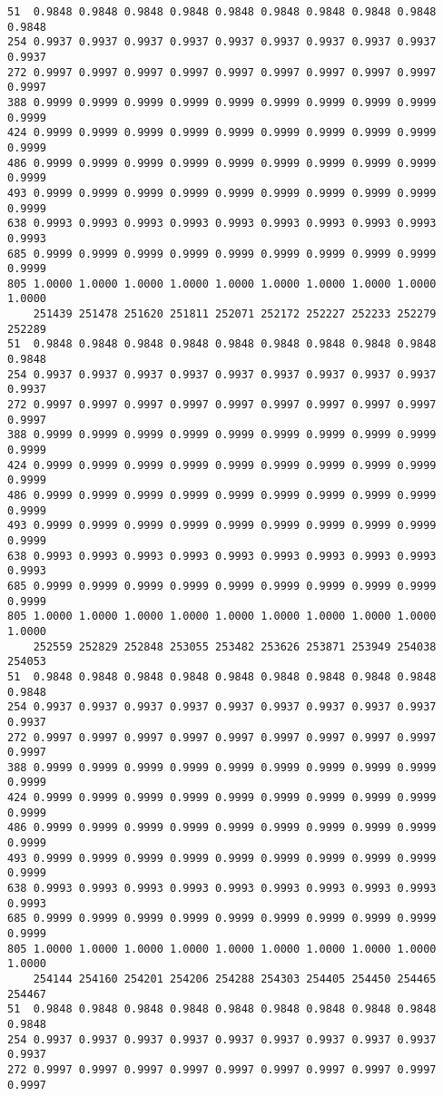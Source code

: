 \documentclass[
]{report}
\begin{document}
\begin{verbatim}
51  0.9848 0.9848 0.9848 0.9848 0.9848 0.9848 0.9848 0.9848 0.9848 0.9848
254 0.9937 0.9937 0.9937 0.9937 0.9937 0.9937 0.9937 0.9937 0.9937 0.9937
272 0.9997 0.9997 0.9997 0.9997 0.9997 0.9997 0.9997 0.9997 0.9997 0.9997
388 0.9999 0.9999 0.9999 0.9999 0.9999 0.9999 0.9999 0.9999 0.9999 0.9999
424 0.9999 0.9999 0.9999 0.9999 0.9999 0.9999 0.9999 0.9999 0.9999 0.9999
486 0.9999 0.9999 0.9999 0.9999 0.9999 0.9999 0.9999 0.9999 0.9999 0.9999
493 0.9999 0.9999 0.9999 0.9999 0.9999 0.9999 0.9999 0.9999 0.9999 0.9999
638 0.9993 0.9993 0.9993 0.9993 0.9993 0.9993 0.9993 0.9993 0.9993 0.9993
685 0.9999 0.9999 0.9999 0.9999 0.9999 0.9999 0.9999 0.9999 0.9999 0.9999
805 1.0000 1.0000 1.0000 1.0000 1.0000 1.0000 1.0000 1.0000 1.0000 1.0000
    251439 251478 251620 251811 252071 252172 252227 252233 252279 252289
51  0.9848 0.9848 0.9848 0.9848 0.9848 0.9848 0.9848 0.9848 0.9848 0.9848
254 0.9937 0.9937 0.9937 0.9937 0.9937 0.9937 0.9937 0.9937 0.9937 0.9937
272 0.9997 0.9997 0.9997 0.9997 0.9997 0.9997 0.9997 0.9997 0.9997 0.9997
388 0.9999 0.9999 0.9999 0.9999 0.9999 0.9999 0.9999 0.9999 0.9999 0.9999
424 0.9999 0.9999 0.9999 0.9999 0.9999 0.9999 0.9999 0.9999 0.9999 0.9999
486 0.9999 0.9999 0.9999 0.9999 0.9999 0.9999 0.9999 0.9999 0.9999 0.9999
493 0.9999 0.9999 0.9999 0.9999 0.9999 0.9999 0.9999 0.9999 0.9999 0.9999
638 0.9993 0.9993 0.9993 0.9993 0.9993 0.9993 0.9993 0.9993 0.9993 0.9993
685 0.9999 0.9999 0.9999 0.9999 0.9999 0.9999 0.9999 0.9999 0.9999 0.9999
805 1.0000 1.0000 1.0000 1.0000 1.0000 1.0000 1.0000 1.0000 1.0000 1.0000
    252559 252829 252848 253055 253482 253626 253871 253949 254038 254053
51  0.9848 0.9848 0.9848 0.9848 0.9848 0.9848 0.9848 0.9848 0.9848 0.9848
254 0.9937 0.9937 0.9937 0.9937 0.9937 0.9937 0.9937 0.9937 0.9937 0.9937
272 0.9997 0.9997 0.9997 0.9997 0.9997 0.9997 0.9997 0.9997 0.9997 0.9997
388 0.9999 0.9999 0.9999 0.9999 0.9999 0.9999 0.9999 0.9999 0.9999 0.9999
424 0.9999 0.9999 0.9999 0.9999 0.9999 0.9999 0.9999 0.9999 0.9999 0.9999
486 0.9999 0.9999 0.9999 0.9999 0.9999 0.9999 0.9999 0.9999 0.9999 0.9999
493 0.9999 0.9999 0.9999 0.9999 0.9999 0.9999 0.9999 0.9999 0.9999 0.9999
638 0.9993 0.9993 0.9993 0.9993 0.9993 0.9993 0.9993 0.9993 0.9993 0.9993
685 0.9999 0.9999 0.9999 0.9999 0.9999 0.9999 0.9999 0.9999 0.9999 0.9999
805 1.0000 1.0000 1.0000 1.0000 1.0000 1.0000 1.0000 1.0000 1.0000 1.0000
    254144 254160 254201 254206 254288 254303 254405 254450 254465 254467
51  0.9848 0.9848 0.9848 0.9848 0.9848 0.9848 0.9848 0.9848 0.9848 0.9848
254 0.9937 0.9937 0.9937 0.9937 0.9937 0.9937 0.9937 0.9937 0.9937 0.9937
272 0.9997 0.9997 0.9997 0.9997 0.9997 0.9997 0.9997 0.9997 0.9997 0.9997

\end{verbatim}
\end{document}
